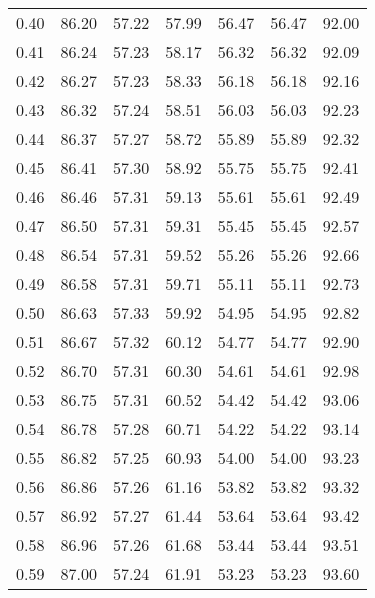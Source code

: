 \begin{tabular}{|c|c|c|c|c|c|c|}
      0.40 &     86.20 &     57.22 &      57.99 &   56.47 &      56.47 &         92.00 \\
      0.41 &     86.24 &     57.23 &      58.17 &   56.32 &      56.32 &         92.09 \\
      0.42 &     86.27 &     57.23 &      58.33 &   56.18 &      56.18 &         92.16 \\
      0.43 &     86.32 &     57.24 &      58.51 &   56.03 &      56.03 &         92.23 \\
      0.44 &     86.37 &     57.27 &      58.72 &   55.89 &      55.89 &         92.32 \\
      0.45 &     86.41 &     57.30 &      58.92 &   55.75 &      55.75 &         92.41 \\
      0.46 &     86.46 &     57.31 &      59.13 &   55.61 &      55.61 &         92.49 \\
      0.47 &     86.50 &     57.31 &      59.31 &   55.45 &      55.45 &         92.57 \\
      0.48 &     86.54 &     57.31 &      59.52 &   55.26 &      55.26 &         92.66 \\
      0.49 &     86.58 &     57.31 &      59.71 &   55.11 &      55.11 &         92.73 \\
      0.50 &     86.63 &     57.33 &      59.92 &   54.95 &      54.95 &         92.82 \\
      0.51 &     86.67 &     57.32 &      60.12 &   54.77 &      54.77 &         92.90 \\
      0.52 &     86.70 &     57.31 &      60.30 &   54.61 &      54.61 &         92.98 \\
      0.53 &     86.75 &     57.31 &      60.52 &   54.42 &      54.42 &         93.06 \\
      0.54 &     86.78 &     57.28 &      60.71 &   54.22 &      54.22 &         93.14 \\
      0.55 &     86.82 &     57.25 &      60.93 &   54.00 &      54.00 &         93.23 \\
      0.56 &     86.86 &     57.26 &      61.16 &   53.82 &      53.82 &         93.32 \\
      0.57 &     86.92 &     57.27 &      61.44 &   53.64 &      53.64 &         93.42 \\
      0.58 &     86.96 &     57.26 &      61.68 &   53.44 &      53.44 &         93.51 \\
      0.59 &     87.00 &     57.24 &      61.91 &   53.23 &      53.23 &         93.60 \\

\end{tabular}
